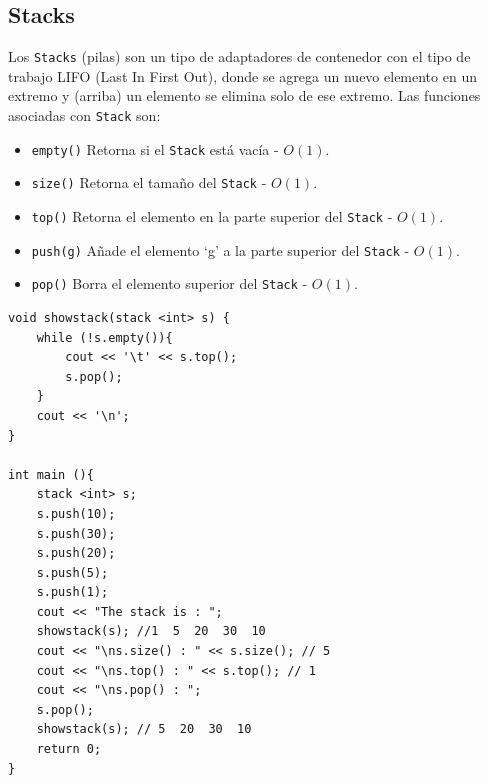 \documentclass[a4paper,12pt]{article}
\begin{document}
\subsection*{Stacks}
Los \texttt{Stacks} (pilas) son un tipo de adaptadores de contenedor con el tipo de trabajo LIFO (Last In First Out), donde se agrega un nuevo elemento en un extremo y (arriba) un elemento se elimina solo de ese extremo. Las funciones asociadas con \texttt{Stack} son:
\begin{itemize}
\item \texttt{empty()} Retorna si el \texttt{Stack} está vacía - $O(1)$.
\item \texttt{size()} Retorna el tamaño del \texttt{Stack} - $O(1)$.
\item \texttt{top()} Retorna el elemento en la parte superior del \texttt{Stack} - $O(1)$.
\item \texttt{push(g)} Añade el elemento `g' a la parte superior del \texttt{Stack} - $O(1)$.
\item \texttt{pop()} Borra el elemento superior del \texttt{Stack} - $O(1)$.
\end{itemize}
\begin{lstlisting}
void showstack(stack <int> s) { 
    while (!s.empty()){ 
        cout << '\t' << s.top(); 
        s.pop(); 
    } 
    cout << '\n'; 
} 
  
int main (){ 
    stack <int> s; 
    s.push(10); 
    s.push(30); 
    s.push(20); 
    s.push(5); 
    s.push(1); 
    cout << "The stack is : ";
    showstack(s); //1  5  20  30  10
    cout << "\ns.size() : " << s.size(); // 5
    cout << "\ns.top() : " << s.top(); // 1
    cout << "\ns.pop() : ";
    s.pop(); 
    showstack(s); // 5  20  30  10
    return 0; 
} 
\end{lstlisting}
\end{document}
